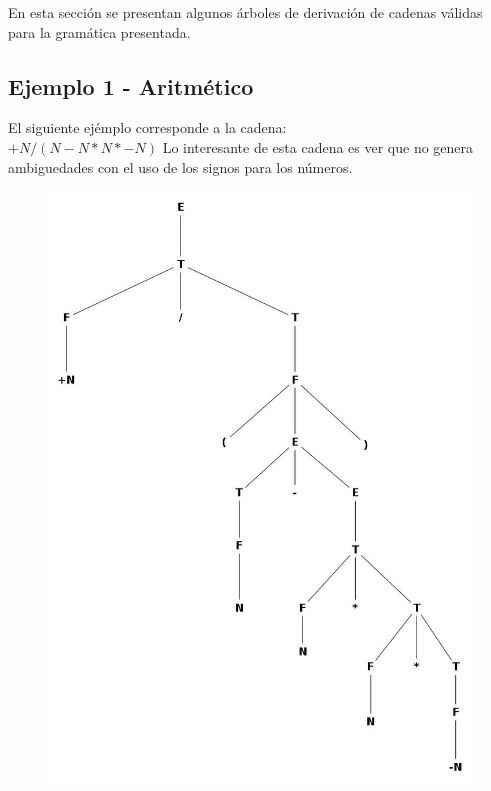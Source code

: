 En esta secci\'on se presentan algunos \'arboles de derivaci\'on de cadenas v\'alidas para la gram\'atica presentada.\\

\subsection{Ejemplo 1 - Aritm\'etico}
El siguiente ej\'emplo corresponde a la cadena:\\
$+N / (N-N*N*-N)$
Lo interesante de esta cadena es ver que no genera ambiguedades con el uso de los signos para los n\'umeros.
\begin{figure}[!h]
\includegraphics[scale=0.40]{arboles_derivacion/ejemplo1.jpg}
\end{figure}
